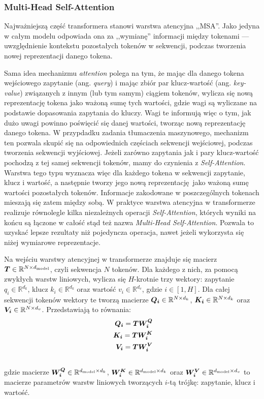 \subsubsection{Multi-Head Self-Attention}

Najważniejszą część transformera stanowi warstwa atencyjna ,,MSA''. Jako jedyna w całym modelu
odpowiada ona za ,,wymianę'' informacji między tokenami --- uwzględnienie kontekstu pozostałych
tokenów w sekwencji, podczas tworzenia nowej reprezentacji danego tokena.

Sama idea mechanizmu \emph{attention} polega na tym, że mając dla danego tokena wejściowego
zapytanie (ang. \emph{query}) i mając zbiór par klucz-wartość (ang. \emph{key-value}) związanych z
innym (lub tym samym) ciągiem tokenów, wylicza się nową reprezentację tokena jako ważoną sumę tych
wartości, gdzie wagi są wyliczane na podstawie dopasowania zapytania do kluczy. Wagi te informują
więc o tym, jak dużo uwagi powinno poświęcić się danej wartości, tworząc nową reprezentację danego
tokena. W przypdadku zadania tłumaczenia maszynowego, mechanizm ten pozwala skupić się na
odpowiednich częściach sekwencji wejściowej, podczas tworzenia sekwencji wyjściowej. Jeżeli zarówno
zapytania jak i pary klucz-wartość pochodzą z tej samej sekwencji tokenów, mamy do czynienia z
\emph{Self-Attention}. Warstwa tego typu wyznacza więc dla każdego tokena w sekwencji zapytanie,
klucz i wartość, a następnie tworzy jego nową reprezentację jako ważoną sumę wartości pozostałych
tokenów. Informacje zakodowane w poszczególnych tokenach mieszają się zatem między sobą. W praktyce
warstwa atencyjna w transformerze realizuje równolegle kilka niezależnych operacji
\emph{Self-Attention}, których wyniki na końcu są łączone w całość stąd też nazwa \emph{Multi-Head
Self-Attention}. Pozwala to uzyskać lepsze rezultaty niż pojedyncza operacja, nawet jeżeli
wykorzysta się niżej wymiarowe reprezentacje.

Na wejściu warstwy atencyjnej w transformerze znajduje się macierz
$\boldsymbol{T} \in \mathbb{R}^{N \times d_{\mathrm{model}}}$, czyli sekwencja $N$ tokenów. Dla każdego z nich, za pomocą
zwykłych warstw liniowych, wylicza się $H$-krotnie trzy wektory: zapytanie $q_i \in
\mathbb{R}^{d_k}$, klucz $k_i \in \mathbb{R}^{d_k}$ oraz wartość $v_i \in \mathbb{R}^{d_v}$, gdzie
$i \in [1, H]$. Dla całej sekwencji tokenów wektory te tworzą macierze $\boldsymbol{Q_i} \in \mathbb{R}^{N \times d_k}$,
$\boldsymbol{K_i} \in \mathbb{R}^{N \times d_k}$ oraz $\boldsymbol{V_i} \in \mathbb{R}^{N \times d_v}$. Przedstawiają to równania:
\begin{eqnarray}
    \boldsymbol{Q_i} = \boldsymbol{T} \boldsymbol{W_i^Q} \\\
    \boldsymbol{K_i} = \boldsymbol{T} \boldsymbol{W_i^K} \\\
    \boldsymbol{V_i} = \boldsymbol{T} \boldsymbol{W_i^V} \\\
\end{eqnarray}
gdzie macierze $\boldsymbol{W_i^Q} \in \mathbb{R}^{d_{\mathrm{model}} \times d_k}$,
$\boldsymbol{W_i^K} \in \mathbb{R}^{d_{\mathrm{model}} \times d_k}$ oraz $\boldsymbol{W_i^V} \in \mathbb{R}^{d_{\mathrm{model}} \times d_v}$ to
macierze parametrów warstw liniowych tworzących $i$-tą trójkę: zapytanie, klucz i wartość.

